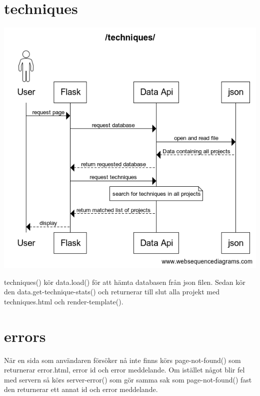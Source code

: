 \documentclass{TDP003mall}
\begin{document}
\section{techniques}
\begin{center}
\includegraphics[scale=0.35]{techniques_.png}
\end{center}
techniques() kör data.load() för att hämta databasen från json filen. Sedan kör den data.get-technique-stats() och returnerar till slut alla projekt med techniques.html och render-template().
\section{errors}
När en sida som användaren försöker nå inte finns körs page-not-found() som returnerar error.html, error id och error meddelande. Om istället något blir fel med servern så körs server-error() som gör samma sak som page-not-found() fast den returnerar ett annat id och error meddelande.
\end{document}
